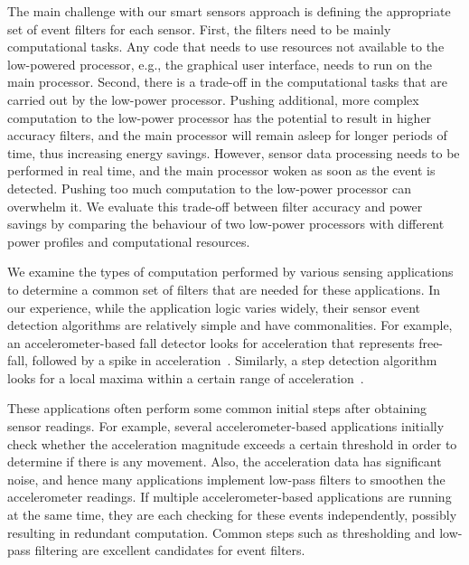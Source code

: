 The main challenge with our smart sensors approach is defining the
appropriate set of event filters for each sensor. First, the filters
need to be mainly computational tasks. Any code that needs to use
resources not available to the low-powered processor, e.g., the
graphical user interface, needs to run on the main processor. Second,
there is a trade-off in the computational tasks that are carried out
by the low-power processor. Pushing additional, more complex computation to the
low-power processor has the potential to result in higher accuracy filters,
and the main processor will remain asleep for longer periods of time,
thus increasing energy savings. However, sensor data processing needs to be
performed in real time, and the main processor woken as soon as the event 
is detected. Pushing too much computation to the low-power processor can overwhelm it.
We evaluate this trade-off between filter accuracy and power savings by comparing the
behaviour of two low-power processors with different power profiles and 
computational resources.




We examine the types of computation performed by various sensing applications to
determine a common set of filters that are needed for these applications. In our
experience, while the application logic varies widely, their sensor event
detection algorithms are relatively simple and have commonalities. For example,
an accelerometer-based fall detector looks for acceleration that represents
free-fall, followed by a spike in acceleration~\cite{kangasFallDetection}. Similarly, a step
detection algorithm looks for a local maxima within a certain range of
acceleration~\cite{libbyFootstepDetection}. 

These applications often perform some common initial steps after obtaining sensor 
readings. For example, several
accelerometer-based applications initially check whether the acceleration
magnitude exceeds a certain threshold in order to determine if there is any
movement. Also, the acceleration data has significant noise, and hence many
applications implement low-pass filters to smoothen the accelerometer readings.
If multiple accelerometer-based applications are running at the same time, they
are each checking for these events independently, possibly resulting in
redundant computation. Common steps such as thresholding and low-pass filtering
are excellent candidates for event filters.

